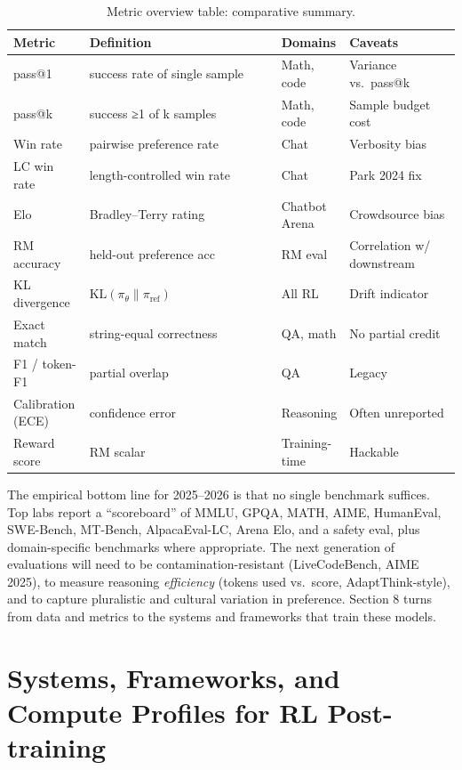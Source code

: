 \documentclass{article}
\begin{document}
\begin{table}[t]
\centering
\caption{Metric overview table: comparative summary.}
\label{tab:metric-overview-table}
\begin{tabular}{>{\raggedright\arraybackslash}p{0.1735\linewidth}
  >{\raggedright\arraybackslash}p{0.4388\linewidth}
  >{\raggedright\arraybackslash}p{0.1327\linewidth}
  >{\raggedright\arraybackslash}p{0.2551\linewidth}}
\toprule
Metric & Definition & Domains & Caveats \\
\midrule
pass@1 & success rate of single sample & Math, code & Variance vs.~pass@k \\
pass@k & success ≥1 of k samples & Math, code & Sample budget cost \\
Win rate & pairwise preference rate & Chat & Verbosity bias \\
LC win rate & length-controlled win rate & Chat & Park 2024 fix \\
Elo & Bradley--Terry rating & Chatbot Arena & Crowdsource bias \\
RM accuracy & held-out preference acc & RM eval & Correlation w/ downstream \\
KL divergence & \(\mathrm{KL}(\pi_\theta\|\pi_{\text{ref}})\) & All RL & Drift indicator \\
Exact match & string-equal correctness & QA, math & No partial credit \\
F1 / token-F1 & partial overlap & QA & Legacy \\
Calibration (ECE) & confidence error & Reasoning & Often unreported \\
Reward score & RM scalar & Training-time & Hackable \\
\end{tabular}
\end{table}

The empirical bottom line for 2025--2026 is that no single benchmark suffices. Top labs report a ``scoreboard'' of MMLU, GPQA, MATH, AIME, HumanEval, SWE-Bench, MT-Bench, AlpacaEval-LC, Arena Elo, and a safety eval, plus domain-specific benchmarks where appropriate. The next generation of evaluations will need to be contamination-resistant (LiveCodeBench, AIME 2025), to measure reasoning \emph{efficiency} (tokens used vs.~score, AdaptThink-style), and to capture pluralistic and cultural variation in preference. Section 8 turns from data and metrics to the systems and frameworks that train these models.

\section{Systems, Frameworks, and Compute Profiles for RL Post-training}\label{systems-frameworks-and-compute-profiles-for-rl-post-training}
\end{document}
